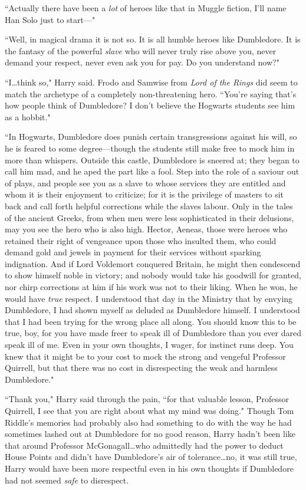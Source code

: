 ``Actually there have been a \emph{lot} of heroes like that in Muggle fiction, I'll name Han Solo just to start—"

``Well, in magical drama it is not so. It is all humble heroes like Dumbledore. It is the fantasy of the powerful \emph{slave} who will never truly rise above you, never demand your respect, never even ask you for pay. Do you understand now?"

``I…think so," Harry said. Frodo and Samwise from \emph{Lord of the Rings} did seem to match the archetype of a completely non-threatening hero. ``You're saying that's how people think of Dumbledore? I don't believe the Hogwarts students see him as a hobbit."

``In Hogwarts, Dumbledore does punish certain transgressions against his will, so he is feared to some degree—though the students still make free to mock him in more than whispers. Outside this castle, Dumbledore is sneered at; they began to call him mad, and he aped the part like a fool. Step into the role of a saviour out of plays, and people see you as a slave to whose services they are entitled and whom it is their enjoyment to criticize; for it is the privilege of masters to sit back and call forth helpful corrections while the slaves labour. Only in the tales of the ancient Greeks, from when men were less sophisticated in their delusions, may you see the hero who is also high. Hector, Aeneas, those were heroes who retained their right of vengeance upon those who insulted them, who could demand gold and jewels in payment for their services without sparking indignation. And if Lord Voldemort conquered Britain, he might then condescend to show himself noble in victory; and nobody would take his goodwill for granted, nor chirp corrections at him if his work was not to their liking. When he won, he would have \emph{true} respect. I understood that day in the Ministry that by envying Dumbledore, I had shown myself as deluded as Dumbledore himself. I understood that I had been trying for the wrong place all along. You should know this to be true, boy, for you have made freer to speak ill of Dumbledore than you ever dared speak ill of me. Even in your own thoughts, I wager, for instinct runs deep. You knew that it might be to your cost to mock the strong and vengeful Professor Quirrell, but that there was no cost in disrespecting the weak and harmless Dumbledore."

``Thank you," Harry said through the pain, ``for that valuable lesson, Professor Quirrell, I see that you are right about what my mind was doing." Though Tom Riddle's memories had probably also had something to do with the way he had sometimes lashed out at Dumbledore for no good reason, Harry hadn't been like that around Professor McGonagall…who admittedly had the power to deduct House Points and didn't have Dumbledore's air of tolerance…no, it was still true, Harry would have been more respectful even in his own thoughts if Dumbledore had not seemed \emph{safe} to disrespect.

